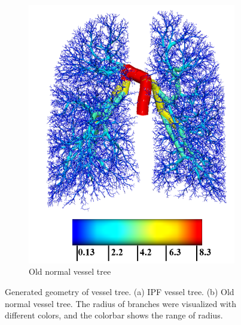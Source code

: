 \begin{figure}[htbp]
\begin{subfigure}{.38\linewidth}
  \includegraphics[width=\linewidth,trim={{.0\wd0} {.0\wd0} {.0\wd0} {.0\wd0}},clip]{ModelBasedAnalysis/Image/IPF405_ArteryRadius_Normal.png}
  \caption{Old normal vessel tree}
  \label{fig:VesselTreeGeometry-b} 
\end{subfigure}
\caption{Generated geometry of vessel tree. (a) IPF vessel tree. (b) Old normal vessel tree. The radius of branches were visualized with different colors, and the colorbar shows the range of radius.} 
\label{fig:VesselTreeGeometry}
\end{figure}

